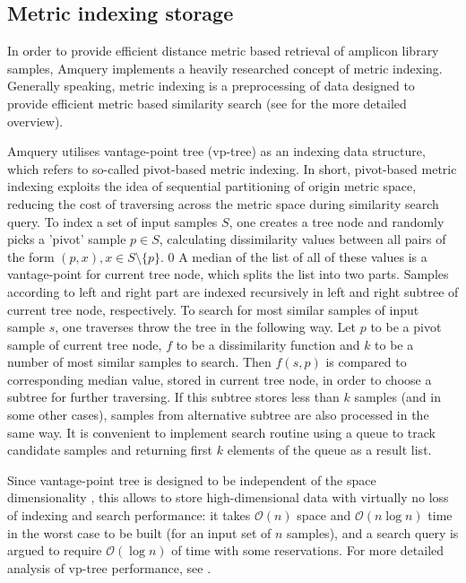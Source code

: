 \documentclass[10pt,letterpaper]{article}
\begin{document}
\subsection*{Metric indexing storage}
In order to provide efficient distance metric based retrieval of amplicon library samples, 
Amquery implements a heavily researched concept of metric indexing. Generally speaking, metric indexing 
is a preprocessing of data designed to provide efficient metric based similarity search 
(see \cite{hetland2009basic} for the more detailed overview).

Amquery utilises vantage-point tree (vp-tree) \cite{yianilos1993data, chavez2001searching} as an indexing 
data structure, which refers to so-called pivot-based metric indexing.
In short, pivot-based metric indexing exploits the idea of sequential partitioning of origin metric 
space, reducing the cost of traversing across the metric space during similarity search query. 
To index a set of input samples $S$, one creates a tree node and randomly picks a 'pivot' sample $p \in S$, calculating dissimilarity 
values between all pairs of the form $(p, x), x \in S \setminus \{ p \}$. 0
A median of the list of all of these values is a vantage-point for current tree node, which splits the list into two parts. Samples according to left and right part are indexed recursively in left and right subtree of current tree node, respectively.
To search for most similar samples of input sample $s$, one traverses throw the tree in the following way. Let $p$ to be a pivot sample of current tree node, $f$ to be a dissimilarity function and $k$ to be a number of most similar samples to search.
Then $f(s, p)$ is compared to corresponding median value, stored in current tree node, in order to choose a subtree for further traversing. If this subtree stores less than $k$ samples (and in some other cases), samples from alternative subtree are also processed in the same way. It is convenient to implement search routine using a queue to track candidate samples and returning first $k$ elements of the queue as a result list.

Since vantage-point tree is designed to be independent of the space dimensionality \cite{yianilos1993data}, this allows to store high-dimensional data with virtually no loss of indexing and search performance: it takes $\mathcal{O}(n)$ space and $\mathcal{O}(n \log n)$ time in the worst case to be built (for an input set of $n$ samples), and a search query is argued to require $\mathcal{O}(\log n)$ of time with some reservations. For more detailed analysis of vp-tree performance, see \cite{yianilos1993data}.
\end{document}
